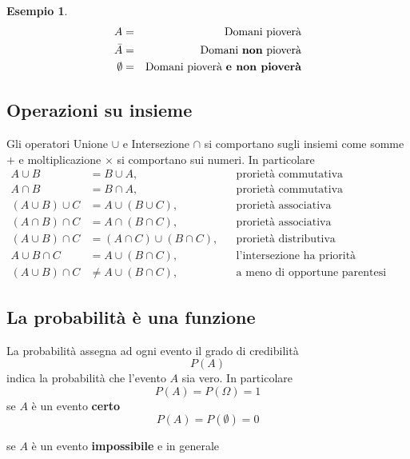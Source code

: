 \documentclass[
  11pt,
]{book}
\theoremstyle{mytheoremstyle}
\theoremstyle{mydefstyle}
\newtheorem{example}{{Esempio}}[section]
\newenvironment{nota}
  {
\begin{tcolorbox}[enhanced,breakable,arc=0.1mm,boxrule=1pt,colback=white,colframe=iblue,title=\bf \fontfamily{lmss}\selectfont \faInfoCircle \hspace{.5 cm} Nota,drop fuzzy shadow]
}{
\end{tcolorbox}
  }
\begin{document}
\begin{example}
\begin{eqnarray*}
    A&=&  \text{Domani pioverà}\\
    \bar A&=&  \text{Domani }\textbf{non}\text{ pioverà}\\
    \emptyset &=& \text{Domani pioverà \bf e non pioverà}
\end{eqnarray*}
\end{example}

\subsection{Operazioni su insieme}\label{operazioni-su-insieme}

\begin{nota}
Gli operatori Unione \(\cup\) e Intersezione \(\cap\) si comportano sugli
insiemi come somme \(+\) e moltiplicazione \(\times\) si comportano sui
numeri. In particolare
\begin{align*}
  A\cup B &=  B\cup A ,&&\text{prorietà commutativa}\\
  A\cap B &=  B\cap A ,&&\text{prorietà commutativa}\\
  (A\cup B)\cup C &=   A\cup (B\cup C),       &&\text{prorietà associativa}\\
  (A\cap B)\cap C &=   A\cap (B\cap C),       &&\text{prorietà associativa}\\
  (A\cup B)\cap C &=  (A\cap C)\cup(B\cap C), &&\text{prorietà distributiva}\\
  A\cup B\cap C   &=   A\cup (B\cap C),       &&\text{l'intersezione ha priorità sull'unione...}\\ 
  (A\cup B)\cap C &\ne A\cup (B\cap C),       &&\text{a meno di opportune parentesi}
\end{align*}

\end{nota}

\subsection{La probabilità è una funzione}\label{la-probabilituxe0-uxe8-una-funzione}

La probabilità assegna ad ogni evento il grado di credibilità
\[
P(A)
\]
indica la probabilità che l'evento \(A\) sia vero. In particolare
\[
P(A)=P(\Omega)=1
\]
se \(A\) è un evento \textbf{certo}
\[
P(A)=P(\emptyset)=0
\]

se \(A\) è un evento \textbf{impossibile} e in generale
\end{document}
